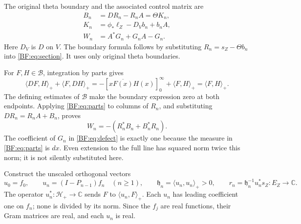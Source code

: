 The original theta boundary and the associated control matrix are
\begin{equation}
\begin{split}
B_n&=DR_n-R_nA=\Theta K_n,\\
K_n&=\phi_*\ell_Z-D_Vb_n+b_nA,\\
W_n&=A^*G_n+G_nA-G_n.
\end{split}
\tag{BF.10}\label{BF:eq:defect}
\end{equation}
Here \(D_V\) is \(D\) on \(V\).  The boundary formula follows by
substituting \(R_n=s_Z-\Theta b_n\) into
\eqref{BF:eq:section}.  It uses only original theta boundaries.

For \(F,H\in\mathcal B\), integration by parts gives
\begin{equation}
\langle DF,H\rangle_++\langle F,DH\rangle_+
=-\left[x\overline{F(x)}H(x)\right]_{0}^{\infty}
 +\langle F,H\rangle_+
=\langle F,H\rangle_+.
\tag{BF.11}\label{BF:eq:parts}
\end{equation}
The defining estimates of \(\mathcal B\) make the boundary expression
zero at both endpoints.  Applying \eqref{BF:eq:parts} to columns of
\(R_n\), and substituting \(DR_n=R_nA+B_n\), proves
\begin{equation}
W_n=-(R_n^*B_n+B_n^*R_n).
\tag{BF.12}\label{BF:eq:cross-defect}
\end{equation}
The coefficient of \(G_n\) in \eqref{BF:eq:defect} is exactly one
because the measure in \eqref{BF:eq:parts} is \(dx\).
Even extension to the full line has squared norm twice this norm;
it is not silently substituted here.

Construct the unscaled orthogonal vectors
\begin{equation}
u_0=f_0,\qquad
u_n=(I-P_{n-1})f_n\quad(n\ge1),\qquad
\mathfrak h_n=\langle u_n,u_n\rangle_+>0,\qquad
r_n=\mathfrak h_n^{-1}u_n^*s_Z:E_Z\to\mathbb C.
\tag{BF.13}\label{BF:eq:unscaled-rows}
\end{equation}
The operator \(u_n^*:\mathcal H_+\to\mathbb C\) sends \(F\) to
\(\langle u_n,F\rangle_+\).  Each \(u_n\) has leading coefficient
one on \(f_n\); none is divided by its norm.  Since the \(f_j\) are
real functions, their Gram matrices are real, and each \(u_n\) is
real.

